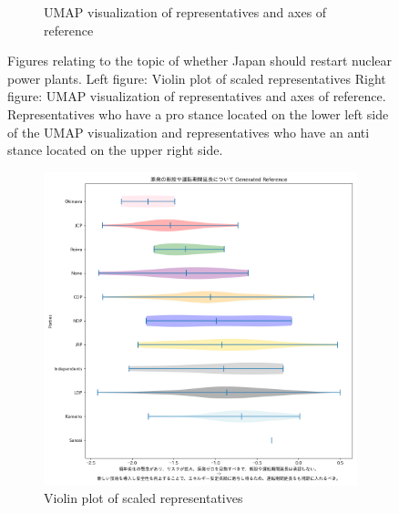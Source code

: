 \documentclass[final,5p,times,twocolumn,authoryear]{elsarticle}
\begin{document}
\begin{figure}[h]
\begin{subfigure}{0.22\textwidth}
      \caption{UMAP visualization of representatives and axes of reference}
    \end{subfigure}
\caption{Figures relating to the topic of whether Japan should restart nuclear power plants. Left figure: Violin plot of scaled representatives Right figure: UMAP visualization of representatives and axes of reference. Representatives who have a pro stance located on the lower left side of the UMAP visualization and representatives who have an anti stance located on the upper right side.}
\label{fig: restarting-nuclear}
\end{figure}

\begin{figure}[h]
\centering
    \begin{subfigure}{0.22\textwidth}
      \centering
      \includegraphics[width=1\linewidth]{figs/results/nuclear/原発の新設や運転期間延長について_gen_violin_plot.png}
      \caption{Violin plot of scaled representatives}
    \end{subfigure}
    \begin{subfigure}{0.22\textwidth}
      \centering

\end{subfigure}
\end{figure}
\end{document}
